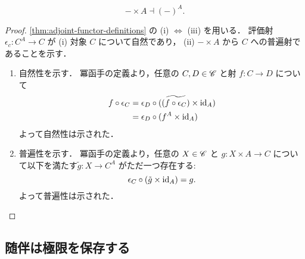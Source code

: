 \documentclass[titlepage]{ltjsreport}
\begin{document}
\begin{theorem}[並列定義の系]
  \begin{equation}
    -\times A\dashv{(-)}^A.
  \end{equation}
\end{theorem}

\begin{proof}
  \cref{thm:adjoint-functor-definitions} の (i) $\Leftrightarrow$ (iii) を用いる．
  評価射 $\epsilon_c:{C}^A\to C$ が
  (i) 対象 $C$ について自然であり，
  (ii) $-\times A$ から $C$ への普遍射であることを示す．

  \begin{enumerate}[label=(\roman*)] %
    \item 自然性を示す．
          冪函手の定義より，任意の $C,D\in\mathscr{C}$ と射 $f:C\to D$ について
          \begin{align*}
            f\circ\epsilon_C
             & =\epsilon_D\circ(\widetilde{(f\circ\epsilon_C)}\times\mathrm{id}_{A}) \\
             & =\epsilon_D\circ(f^A\times\mathrm{id}_{A})                            \\
          \end{align*}
          よって自然性は示された．
    \item 普遍性を示す．
          冪函手の定義より，任意の $X\in\mathscr{C}$ と $g:X\times A\to C$
          について以下を満たす$\tilde{g}:X\to C^A$ がただ一つ存在する:
          \begin{equation*}
            \epsilon_C\circ(\tilde{g}\times\mathrm{id}_{A})=g.
          \end{equation*}
          よって普遍性は示された．
  \end{enumerate}
\end{proof}

\subsection{随伴は極限を保存する}
\end{document}
